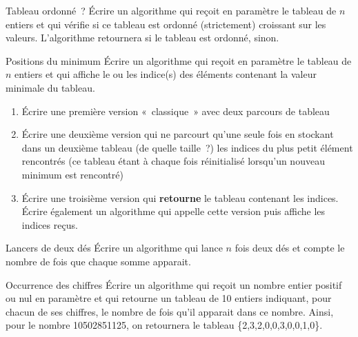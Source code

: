 	\begin{Exercice}{Tableau ordonné~?}
		Écrire un algorithme qui reçoit en paramètre 
		le tableau  de $n$ entiers 
		et qui vérifie si ce tableau est ordonné 
		(strictement) croissant sur les valeurs. 
		L’algorithme retournera  si le tableau est ordonné,
		 sinon.
	\end{Exercice}
	
	\begin{Exercice}{Positions du minimum}
		Écrire un algorithme qui reçoit en paramètre le tableau
		 de $n$ entiers et qui
		affiche le ou les indice(s) des éléments 
		contenant la valeur minimale du tableau.
	
		\begin{enumerate}[label=\alph*)]
		\item 
			Écrire une première version «~classique~» avec deux parcours de tableau
		\item
			Écrire une deuxième version qui ne parcourt qu’une seule fois 
			 en
			stockant dans un deuxième tableau (de quelle taille~?)
			les indices du plus petit élément
			rencontrés (ce tableau étant à chaque fois réinitialisé lorsqu’un
			nouveau minimum est rencontré)
		\item
			Écrire une troisième version qui \textbf{retourne} 
			le tableau contenant les indices.
			Écrire également un algorithme 
			qui appelle cette version puis affiche les indices reçus. 
		\end{enumerate}
	\end{Exercice}

	\begin{Exercice}{Lancers de deux dés}
		Écrire un algorithme qui lance $n$ fois deux dés
		et compte le nombre de fois que chaque somme apparait.
		\begin{LDA}
		\end{LDA}
	\end{Exercice}
	
	\begin{Exercice}{Occurrence des chiffres}
		Écrire un algorithme qui reçoit 
		un nombre entier positif ou nul en paramètre
		et qui retourne un tableau de 10 entiers
		indiquant, pour chacun de ses chiffres, 
		le nombre de fois qu’il apparait dans ce nombre. 
		Ainsi, pour le nombre 10502851125, on retournera
		le tableau \{2,3,2,0,0,3,0,0,1,0\}.
	\end{Exercice}
	
